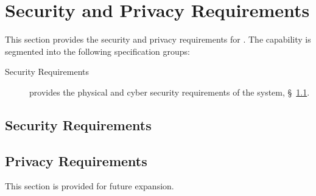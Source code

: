 \KNEADSECTIONNEWPAGE
\section{Security and Privacy Requirements}
\label{lab:sec_SecurityPrivacy}


This section provides the security and privacy requirements for \ThisSys. The \ThisSys capability is segmented into the following specification groups:

\begin{description}
	\item [Security Requirements] provides the physical and cyber security requirements of the system, \S~\ref{lab:ssec_Security}.
\end{description}

\KNEADSUBSECTIONNEWPAGE
\subsection{Security Requirements}
\label{lab:ssec_Security}






\KNEADSUBSECTIONNEWPAGE
\subsection{Privacy Requirements}
\label{lab:ssec_Privacy}

This section is provided for future expansion.

%